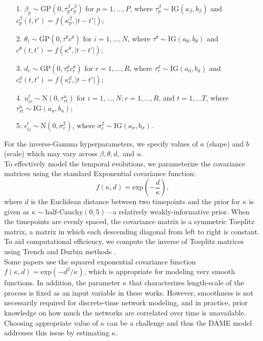\documentclass[a4paper]{article}
\begin{document}
\begin{center}
\begin{itemize}
	\item[1.] $\beta_{p}\sim \mbox{GP}(0, \tau^{\beta}_pc^\beta_{p})\mbox{ for }p = 1,\ldots,P$, where $\tau^{\beta}_p \sim \mbox{IG}(a_\beta, b_\beta)$ and $c^\beta_p(t, t')=f(\kappa^\beta_{p}, |t-t'|)$;
	\item[2.] $\theta_{i}\sim \mbox{GP}(0, \tau^{\theta}c^\theta)\mbox{ for }i = 1,\ldots,N$, where $\tau^{\theta}\sim \mbox{IG}(a_\theta, b_\theta)$ and $c^\theta(t, t')=f(\kappa^\theta, |t-t'|)$;
	\item[3.] $d_{r}\sim \mbox{GP}(0, \tau^{d}_r c^d_r)\mbox{ for }r = 1,\ldots,R$, where $\tau_r^{d} \sim \mbox{IG}(a_d, b_d)$ and  $c^d_r(t, t')=f(\kappa^d_{r}, |t-t'|)$;
	\item[4.] $u^t_{ir}\sim\mbox{N}(0, {\tau}^u_{rt})\mbox{ for }i = 1,\ldots,N; r=1,\ldots,R$, and $t=1,\ldots T$, where ${\tau}^u_{rt}\sim \mbox{IG}(a_u, b_u)$;
	\item[5.] $\epsilon^t_{ij} \sim \mbox{N}(0, \sigma_e^2)$, where $\sigma_e^2 \sim \mbox{IG}(a_\sigma, b_\sigma)$. 
\end{itemize}
\end{center}
 For the inverse-Gamma hyperparameters, we specify values of $a$ (shape) and $b$ (scale) which may vary across $\beta, \theta, d,$ and  $u$. %
\\ \newline
To effectively model the temporal evolutions, we parameterize the covariance matrices using the standard Exponential covariance function:
\begin{equation*}
f(\kappa, d) = \mbox{exp}\left(-\frac{d}{\kappa}\right),
\end{equation*}
where $d$ is the Euclidean distance between two timepoints and the prior for $\kappa$ is given as $\kappa \sim \mbox{half-Cauchy}(0, 5)$---a relatively weakly-informative prior. When the timepoints are evenly spaced, the covariance matrix is a symmetric Toeplitz matrix, a matrix in which each descending diagonal from left to right is constant. To aid computational efficiency, we compute the inverse of Toeplitz matrices using Trench and Durbin methods \citep{golub2012matrix}. \\ \newline
Some papers \citep{bhattacharya2011sparse,durante2013nonparametric,durante2014bayesian} use the squared exponential covariance function $f(\kappa, d) = \mbox{exp}(-d^2/{\kappa})$, which is appropriate for modeling very smooth functions. In addition, the parameter $\kappa$ that characterizes length-scale of the process is fixed as an input variable in these works. However, smoothness is not necessarily required for discrete-time network modeling, and in practice, prior knowledge on how much the networks are correlated over time is unavailable. Choosing appropriate value of $\kappa$ can be a challenge and thus the DAME model addresses this issue by estimating $\kappa$. 
\end{document}
